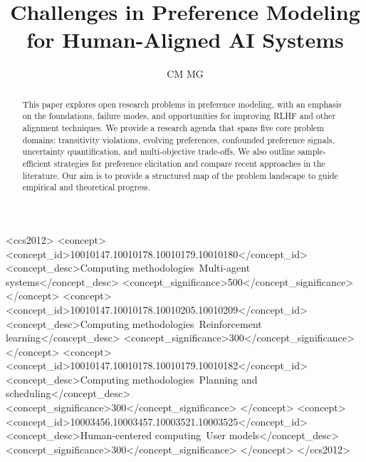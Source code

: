 \documentclass[sigconf]{acmart}
\begin{document}
\title{Challenges in Preference Modeling for Human-Aligned AI Systems}

\author{CM MG}

\renewcommand{\shortauthors}{CM MG}

\begin{abstract}
This paper explores open research problems in preference modeling, with an emphasis on the foundations, failure modes, and opportunities for improving RLHF and other alignment techniques. We provide a research agenda that spans five core problem domains: transitivity violations, evolving preferences, confounded preference signals, uncertainty quantification, and multi-objective trade-offs. We also outline sample-efficient strategies for preference elicitation and compare recent approaches in the literature. Our aim is to provide a structured map of the problem landscape to guide empirical and theoretical progress.
\end{abstract}

\begin{CCSXML}
<ccs2012>
 <concept>
  <concept_id>10010147.10010178.10010179.10010180</concept_id>
  <concept_desc>Computing methodologies~Multi-agent systems</concept_desc>
  <concept_significance>500</concept_significance>
 </concept>
 <concept>
  <concept_id>10010147.10010178.10010205.10010209</concept_id>
  <concept_desc>Computing methodologies~Reinforcement learning</concept_desc>
  <concept_significance>300</concept_significance>
 </concept>
 <concept>
  <concept_id>10010147.10010178.10010179.10010182</concept_id>
  <concept_desc>Computing methodologies~Planning and scheduling</concept_desc>
  <concept_significance>300</concept_significance>
 </concept>
 <concept>
  <concept_id>10003456.10003457.10003521.10003525</concept_id>
  <concept_desc>Human-centered computing~User models</concept_desc>
  <concept_significance>300</concept_significance>
 </concept>
</ccs2012>
\end{CCSXML}


\end{document}
